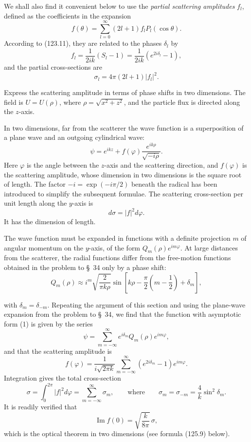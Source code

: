 We shall also find it convenient below to use the \emph{partial scattering
amplitudes} $f_l$, defined as the coefficients in the expansion
\begin{equation}
 f(\theta)=\sum_{l=0}^\infty(2l+1)f_lP_l(\cos\theta).
 \tag{123.14}
\end{equation}
According to (123.11), they are related to the phases $\delta_l$ by
\begin{equation}
 f_l=\frac1{2ik}(S_l-1)=\frac1{2ik}(e^{2i\delta_l}-1),
 \tag{123.15}
\end{equation}
and the partial cross-sections are
\begin{equation}
 \sigma_l=4\pi(2l+1)|f_l|^2.
 \tag{123.16}
\end{equation}

\ProblemHeading

Express the scattering amplitude in terms of phase shifts in two dimensions.
The field is $U=U(\rho)$, where $\rho=\sqrt{x^2+z^2}$, and the particle flux
is directed along the $z$-axis.

\SolutionHeading In two dimensions, far from the scatterer the wave function
is a superposition of a plane wave and an outgoing cylindrical wave:
\begin{equation}
 \psi=e^{ikz}+f(\varphi)\frac{e^{ik\rho}}{\sqrt{-i\rho}}.
 \tag{1}
\end{equation}
Here $\varphi$ is the angle between the $z$-axis and the scattering direction,
and $f(\varphi)$ is the scattering amplitude, whose dimension in two
dimensions is the square root of length. The factor
$-i=\exp(-i\pi/2)$ beneath the radical has been introduced to simplify the
subsequent formulae. The scattering cross-section per unit length along the
$y$-axis is
\[
 d\sigma=|f|^2d\varphi.
\]
It has the dimension of length.

The wave function must be expanded in functions with a definite projection
$m$ of angular momentum on the $y$-axis, of the form
$Q_m(\rho)e^{im\varphi}$. At large distances from the scatterer, the radial
functions differ from the free-motion functions obtained in the problem to
\S~34 only by a phase shift:
\[
 Q_m(\rho)\approx i^m\sqrt{\frac2{\pi k\rho}}
 \sin\left[k\rho-\frac\pi2\left(m-\frac12\right)+\delta_m\right],
\]

with $\delta_m=\delta_{-m}$. Repeating the argument of this section and using
the plane-wave expansion from the problem to \S~34, we find that the function
with asymptotic form (1) is given by the series
\[
 \psi=\sum_{m=-\infty}^{\infty}e^{i\delta_m}Q_m(\rho)e^{im\varphi},
\]
and that the scattering amplitude is
\begin{equation}
 f(\varphi)=\frac1{i\sqrt{2\pi k}}
 \sum_{m=-\infty}^{\infty}(e^{2i\delta_m}-1)e^{im\varphi}.
 \tag{2}
\end{equation}
Integration gives the total cross-section
\[
 \sigma=\int_0^{2\pi}|f|^2d\varphi
 =\sum_{m=-\infty}^{\infty}\sigma_m,
 \qquad \text{where}\qquad
 \sigma_m=\sigma_{-m}=\frac4k\sin^2\delta_m.
\]
It is readily verified that
\begin{equation}
 \operatorname{Im}f(0)=\sqrt{\frac{k}{8\pi}}\,\sigma,
 \tag{3}
\end{equation}
which is the optical theorem in two dimensions (see formula (125.9) below).
